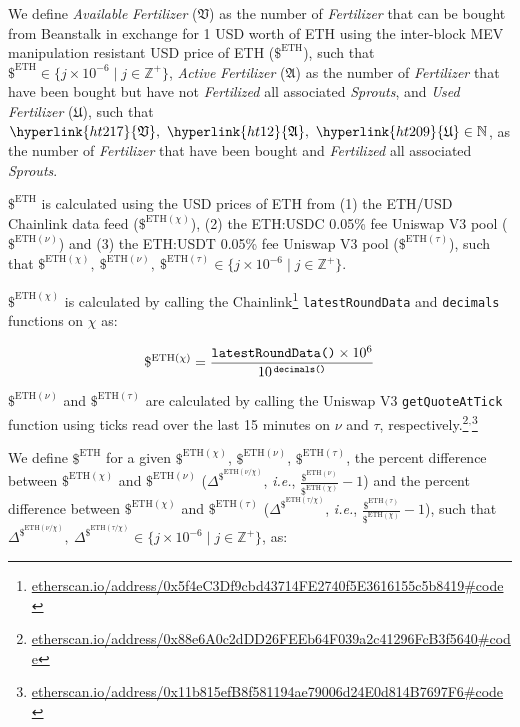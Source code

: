 \documentclass[tikz]{article}
\newcommand{\code}[1]{\texttt{#1}}
\newcommand{\term}[1]{\textsl{#1}}
\newcommand{\fref}[1]{\footnote{\href{http://#1}{#1}}}
\begin{document}
\newpage

We define \term{Available} \term{Fertilizer} (\hyperlink{ht217}{$\mathfrak{V}$}) as the number of \term{Fertilizer} that can be bought from Beanstalk in exchange for 1 USD worth of ETH using the inter-block MEV manipulation resistant USD price of ETH ($\$^{\text{ETH}}$), such that $\$^{\text{ETH}} \in \{j \times 10^{-6} \mid j \in \mathbb{Z}^{+} \}$, \term{Active} \term{Fertilizer} (\hyperlink{ht12}{$\mathfrak{A}$}) as the number of \term{Fertilizer} that have been bought but have not \term{Fertilized} all associated \term{Sprouts}, and \term{Used} \term{Fertilizer} (\hyperlink{ht209}{$\mathfrak{U}$}), such that $\hyperlink{ht217}{\mathfrak{V}},\ \hyperlink{ht12}{\mathfrak{A}},\ \hyperlink{ht209}{\mathfrak{U}} \in \mathbb{N}$, as the number of \term{Fertilizer} that have been bought and \term{Fertilized} all associated \term{Sprouts}. 

$\$^{\text{ETH}}$ is calculated using the USD prices of ETH from (1) the ETH/USD Chainlink data feed ($\$^{\text{ETH}(\chi)}$), (2) the ETH:USDC 0.05\% fee Uniswap V3 pool ($\$^{\text{ETH}(\nu)}$) and (3) the ETH:USDT 0.05\% fee Uniswap V3 pool ($\$^{\text{ETH}(\tau)}$), such that $\$^{\text{ETH}(\chi)},\ \$^{\text{ETH}(\nu)},\ \$^{\text{ETH}(\tau)} \in \{j \times 10^{-6} \mid j \in \mathbb{Z}^{+} \}$.

$\$^{\text{ETH}(\chi)}$ is calculated by calling the Chainlink\fref{etherscan.io/address/0x5f4eC3Df9cbd43714FE2740f5E3616155c5b8419\#code} \code{latestRoundData} and \code{decimals} functions on $\chi$ as:

    $$ 
        \$^{\text{ETH}(\chi)} = \frac{\code{latestRoundData()} \times 10^6}
                                    {10^{\mkern3mu \code{decimals()}}}
    $$

$\$^{\text{ETH}(\nu)}$ and $\$^{\text{ETH}(\tau)}$ are calculated by calling the Uniswap V3 \code{getQuoteAtTick} function using ticks read over the last 15 minutes on $\nu$ and $\tau$, respectively.\fref{etherscan.io/address/0x88e6A0c2dDD26FEEb64F039a2c41296FcB3f5640\#code}$^{,}$\fref{etherscan.io/address/0x11b815efB8f581194ae79006d24E0d814B7697F6\#code}

We define $\$^{\text{ETH}}$ for a given $\$^{\text{ETH}(\chi)}$, $\$^{\text{ETH}(\nu)}$, $\$^{\text{ETH}(\tau)}$, the percent difference between $\$^{\text{ETH}(\chi)}$ and $\$^{\text{ETH}(\nu)}$ ($\Delta^{\$^{\text{ETH}(\nu \slash \chi)}}$, \term{i.e.}, $\frac{\$^{\text{ETH}(\nu)}}{\$^{\text{ETH}(\chi)}} - 1$) and the percent difference between $\$^{\text{ETH}(\chi)}$ and $\$^{\text{ETH}(\tau)}$ ($\Delta^{\$^{\text{ETH}(\tau \slash \chi)}}$, \term{i.e.}, $\frac{\$^{\text{ETH}(\tau)}}{\$^{\text{ETH}(\chi)}} - 1$), such that $\Delta^{\$^{\text{ETH}(\nu \slash \chi)}},\ \Delta^{\$^{\text{ETH}(\tau \slash \chi)}} \in \{j \times 10^{-6} \mid j \in \mathbb{Z}^{+} \}$, as:
\end{document}
